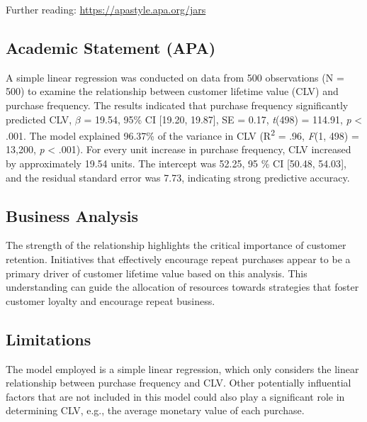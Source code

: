 \documentclass[
]{article}
\begin{document}
Further reading: \url{https://apastyle.apa.org/jars}

\subsection{Academic Statement (APA)}\label{academic-statement-apa}

A simple linear regression was conducted on data from 500 observations
(N = 500) to examine the relationship between customer lifetime value
(CLV) and purchase frequency. The results indicated that purchase
frequency significantly predicted CLV, \(\beta\) = 19.54, 95\% CI
{[}19.20, 19.87{]}, SE = 0.17, \emph{t}(498) = 114.91, \emph{p}
\textless{} .001. The model explained 96.37\% of the variance in CLV
(R\textsuperscript{2} = .96, \emph{F}(1, 498) = 13,200, \emph{p}
\textless{} .001). For every unit increase in purchase frequency, CLV
increased by approximately 19.54 units. The intercept was 52.25, 95 \%
CI {[}50.48, 54.03{]}, and the residual standard error was 7.73,
indicating strong predictive accuracy.

\subsection{Business Analysis}\label{business-analysis}

The strength of the relationship highlights the critical importance of
customer retention. Initiatives that effectively encourage repeat
purchases appear to be a primary driver of customer lifetime value based
on this analysis. This understanding can guide the allocation of
resources towards strategies that foster customer loyalty and encourage
repeat business.

\subsection{Limitations}\label{limitations}

The model employed is a simple linear regression, which only considers
the linear relationship between purchase frequency and CLV. Other
potentially influential factors that are not included in this model
could also play a significant role in determining CLV, e.g., the average
monetary value of each purchase.
\end{document}
